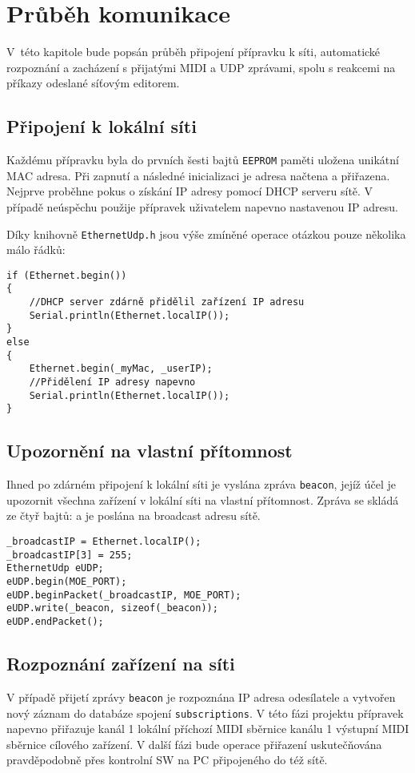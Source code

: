 \chapter{Průběh komunikace}
V~této kapitole bude popsán průběh připojení přípravku k síti, automatické rozpoznání a zacházení s přijatými \acs{MIDI} a \acs{UDP} zprávami, spolu s reakcemi na příkazy odeslané síťovým editorem.

\section{Připojení k lokální síti}
Každému přípravku byla do prvních šesti bajtů \texttt{EEPROM} paměti uložena unikátní MAC adresa. Při zapnutí a následné inicializaci je adresa načtena a přiřazena. Nejprve proběhne pokus o získání IP adresy pomocí DHCP serveru sítě. V případě neúspěchu použije přípravek uživatelem napevno nastavenou IP adresu. 

Díky knihovně \texttt{EthernetUdp.h} jsou výše zmíněné operace otázkou pouze několika málo řádků:

\begin{lstlisting}
if (Ethernet.begin())
{
    //DHCP server zdárně přidělil zařízení IP adresu
    Serial.println(Ethernet.localIP());
}
else
{
    Ethernet.begin(_myMac, _userIP);
    //Přidělení IP adresy napevno
    Serial.println(Ethernet.localIP());
}
\end{lstlisting}






\section{Upozornění na vlastní přítomnost}
Ihned po zdárném připojení k lokální síti je vyslána zpráva  \texttt{beacon}, jejíž účel je upozornit všechna zařízení v lokální síti na vlastní přítomnost. Zpráva se skládá ze čtyř bajtů:
a je poslána na broadcast adresu sítě.

\begin{lstlisting}
_broadcastIP = Ethernet.localIP();
_broadcastIP[3] = 255;
EthernetUdp eUDP;
eUDP.begin(MOE_PORT);
eUDP.beginPacket(_broadcastIP, MOE_PORT);
eUDP.write(_beacon, sizeof(_beacon));
eUDP.endPacket();
\end{lstlisting}

\section{Rozpoznání zařízení na síti}
V případě přijetí zprávy \texttt{beacon} je rozpoznána IP adresa odesílatele a vytvořen nový záznam do databáze spojení \texttt{sub\-scrip\-tions}. V této fázi projektu přípravek napevno přiřazuje kanál 1  lokální příchozí \acs{MIDI} sběrnice kanálu 1 výstupní \acs{MIDI} sběrnice cílového zařízení. V další fázi bude operace přiřazení uskutečňována pravděpodobně přes kontrolní SW na PC připojeného do též sítě.


